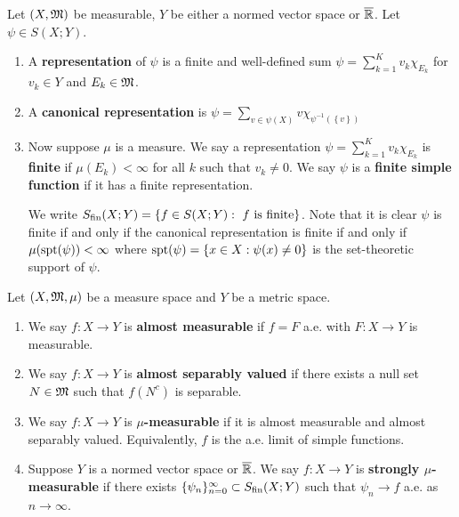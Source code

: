 \documentclass[a4paper]{article}
\renewcommand{\seqinfn}[1]{\{ #1 \}_{n=0}^\infty}
\begin{document}
\begin{defi}

Let $(X, \mathfrak{M})$ be measurable, $Y$ be either a normed vector
space or $\overline{\mathbb{R}}$. Let $\psi \in S(X; Y)$.
\begin{enumerate}
  \item A \textbf{representation} of $\psi$ is a finite and
  well-defined sum
  $\psi = \sum_{k=1}^K v_k \chi_{E_k}$
  for $v_k \in Y$ and $E_k \in \mathfrak{M}$.

  \item A \textbf{canonical representation} is
  $\psi = \sum_{v \in \psi(X)} v \chi_{\psi^{-1}
  (\left\{ v \right\})}$
  \item Now suppose $\mu$ is a measure.
  We say a representation $\psi = \sum_{k=1}^K
  v_k \chi_{E_k}$ is \textbf{finite} if $\mu(E_k) < \infty$
  for all $k$ such that $v_k \neq 0$. We
  say $\psi$ is a \textbf{finite simple function} if it has a
  finite representation.

  We write $S_{\text{fin}}(X; Y) = \left\{
    f \in S(X; Y) : \text{ $f$ is finite}
   \right\}$.
  Note that it is clear $\psi$ is finite if and only if
  the canonical representation is finite if and only if
  $\mu(\operatorname{spt}(\psi)) < \infty$ where
  $\operatorname{spt}(\psi) = \left\{ x \in X : \psi(x) \neq 0 \right\}$
  is the set-theoretic support of $\psi$.
\end{enumerate}

\end{defi}

\begin{defi}
  Let $(X, \mathfrak{M}, \mu)$ be a measure space and $Y$ be a metric
  space.
  \begin{enumerate}
    \item We say $f : X \to Y$ is \textbf{almost measurable}
    if $f = F$ a.e. with $F: X \to Y$ is measurable.

    \item We say $f : X \to Y$ is \textbf{almost separably valued}
    if there exists a null set $N \in \mathfrak{M}$ such that
    $f(N^c)$ is separable.

    \item We say $f: X \to Y$ is \textbf{$\mu$-measurable} if
    it is almost measurable and almost separably valued.
    Equivalently, $f$ is the a.e. limit of simple functions.

    \item Suppose $Y$ is a normed vector space or $\overline{\mathbb{R}}$.
    We say $f: X \to Y$ is \textbf{strongly $\mu$-measurable}
    if there exists $\seqinfn{\psi_n} \subset \Sfin(X; Y)$
    such that $\psi_n \to f$ a.e. as $n \to \infty$.
  \end{enumerate}
\end{defi}
\end{document}
